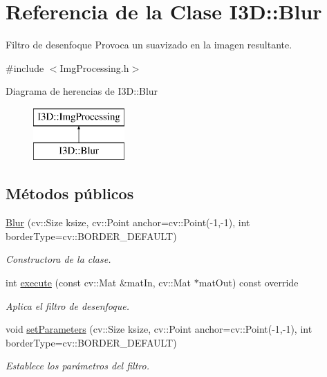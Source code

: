 \hypertarget{class_i3_d_1_1_blur}{}\section{Referencia de la Clase I3D\+:\+:Blur}
\label{class_i3_d_1_1_blur}


Filtro de desenfoque Provoca un suavizado en la imagen resultante.  




{\ttfamily \#include $<$Img\+Processing.\+h$>$}

Diagrama de herencias de I3D\+:\+:Blur\begin{figure}[H]
\begin{center}
\leavevmode
\includegraphics[height=2.000000cm]{class_i3_d_1_1_blur}
\end{center}
\end{figure}
\subsection*{Métodos públicos}
\begin{DoxyCompactItemize}
\item 
\hyperlink{class_i3_d_1_1_blur_a96bf63044e9fad0a439073ca8fb53e7a}{Blur} (cv\+::\+Size ksize, cv\+::\+Point anchor=cv\+::\+Point(-\/1,-\/1), int border\+Type=cv\+::\+B\+O\+R\+D\+E\+R\+\_\+\+D\+E\+F\+A\+U\+LT)
\begin{DoxyCompactList}\small\item\em Constructora de la clase. \end{DoxyCompactList}\item 
int \hyperlink{class_i3_d_1_1_blur_a9bc99ea12ce16294f415f67ce467a81b}{execute} (const cv\+::\+Mat \&mat\+In, cv\+::\+Mat $\ast$mat\+Out) const  override
\begin{DoxyCompactList}\small\item\em Aplica el filtro de desenfoque. \end{DoxyCompactList}\item 
void \hyperlink{class_i3_d_1_1_blur_a5a141450b0eae0a7a44eea935c0bc418}{set\+Parameters} (cv\+::\+Size ksize, cv\+::\+Point anchor=cv\+::\+Point(-\/1,-\/1), int border\+Type=cv\+::\+B\+O\+R\+D\+E\+R\+\_\+\+D\+E\+F\+A\+U\+LT)
\begin{DoxyCompactList}\small\item\em Establece los parámetros del filtro. \end{DoxyCompactList}\end{DoxyCompactItemize}
